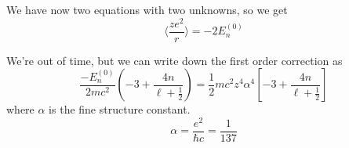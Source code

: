 \documentclass{article}
\theoremstyle{definition}
\begin{document}
We have now two equations with two unknowns, so we get
\begin{equation}
	\langle\frac{ze^2}{r}\rangle=-2E_n^{(0)}
\end{equation}

We're out of time, but we can write down the first order correction as
\begin{equation}
	\frac{-E_n^{(0)}}{2mc^2}\left(-3+\frac{4n}{\ell+\frac{1}{2}}\right)
	=
	\frac{1}{2}mc^2z^4\alpha^4\left[-3+\frac{4n}{\ell+\frac{1}{2}}\right]
\end{equation}
where $\alpha$ is the fine structure constant.
\begin{equation}
	\alpha=\frac{e^2}{\hbar c}=\frac{1}{137}
\end{equation}
\end{document}
